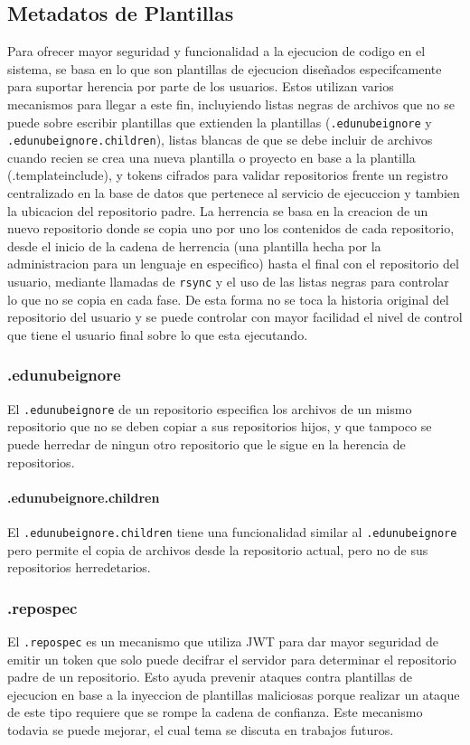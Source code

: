 \subsection{Metadatos de Plantillas}
Para ofrecer mayor seguridad y funcionalidad a la ejecucion de codigo en el sistema, se basa en lo que son plantillas de ejecucion diseñados especifcamente para suportar herencia por parte de los usuarios. Estos utilizan varios mecanismos para llegar a este fin, incluyiendo listas negras de archivos que no se puede sobre escribir plantillas que extienden la plantillas (\texttt{.edunubeignore} y\\ \texttt{.edunubeignore.children}), listas blancas de que se debe incluir de archivos cuando recien se crea una nueva plantilla o proyecto en base a la plantilla (.templateinclude), y tokens cifrados para validar repositorios frente un registro centralizado en la base de datos que pertenece al servicio de ejecuccion y tambien la ubicacion del repositorio padre. La herrencia se basa en la creacion de un nuevo repositorio donde se copia uno por uno los contenidos de cada repositorio, desde el inicio de la cadena de herrencia (una plantilla hecha por la administracion para un lenguaje en especifico) hasta el final con el repositorio del usuario, mediante llamadas de \texttt{rsync} y el uso de las listas negras para controlar lo que no se copia en cada fase. De esta forma no se toca la historia original del repositorio del usuario y se puede controlar con mayor facilidad el nivel de control que tiene el usuario final sobre lo que esta ejecutando. 
\subsubsection{.edunubeignore}
El \texttt{.edunubeignore} de un repositorio especifica los archivos de un mismo repositorio que no se deben copiar a sus repositorios hijos, y que tampoco se puede herredar de ningun otro repositorio que le sigue en la herencia de repositorios.
\paragraph{.edunubeignore.children}
El \texttt{.edunubeignore.children} tiene una funcionalidad similar al \texttt{.edunubeignore} pero permite el copia de archivos desde la repositorio actual, pero no de sus repositorios herredetarios.
\subsubsection{.repospec}
El \texttt{.repospec} es un mecanismo que utiliza JWT para dar mayor seguridad de emitir un token que solo puede decifrar el servidor para determinar el repositorio padre de un repositorio. Esto ayuda prevenir ataques contra plantillas de ejecucion en base a la inyeccion de plantillas maliciosas porque realizar un ataque de este tipo requiere que se rompe la cadena de confianza. Este mecanismo todavia se puede mejorar, el cual tema se discuta en trabajos futuros.
